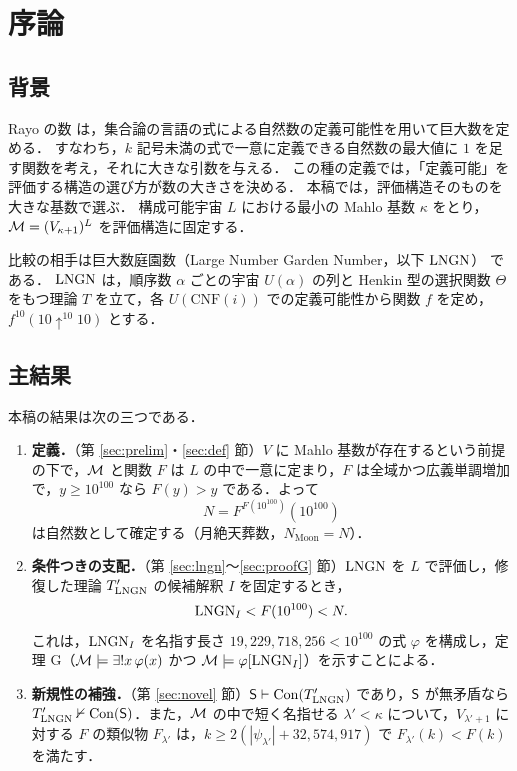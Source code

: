 \section{序論}

\subsection{背景}
Rayo の数 \cite{rayo} は，集合論の言語の式による自然数の定義可能性を用いて巨大数を定める．
すなわち，$k$ 記号未満の式で一意に定義できる自然数の最大値に $1$ を足す関数を考え，それに大きな引数を与える．
この種の定義では，「定義可能」を評価する構造の選び方が数の大きさを決める．
本稿では，評価構造そのものを大きな基数で選ぶ．
構成可能宇宙 $L$ における最小の Mahlo 基数 $\kappa$ をとり，$\mathcal{M}=(V_{\kappa+1})^L$ を評価構造に固定する．

比較の相手は巨大数庭園数（Large Number Garden Number，以下 $\mathrm{LNGN}$）\cite{lngn} である．
$\mathrm{LNGN}$ は，順序数 $\alpha$ ごとの宇宙 $U(\alpha)$ の列と Henkin 型の選択関数 $\Theta$ をもつ理論 $T$ を立て，各 $U(\mathrm{CNF}(i))$ での定義可能性から関数 $f$ を定め，$f^{10}(10\uparrow^{10}10)$ とする．

\subsection{主結果}
本稿の結果は次の三つである．

\begin{enumerate}[label=(\arabic*)]
\item \textbf{定義．}（第 \ref{sec:prelim}・\ref{sec:def} 節）$V$ に Mahlo 基数が存在するという前提の下で，$\mathcal{M}$ と関数 $F$ は $L$ の中で一意に定まり，$F$ は全域かつ広義単調増加で，$y\ge 10^{100}$ なら $F(y)>y$ である．よって
\[ N = F^{F(10^{100})}(10^{100}) \]
は自然数として確定する（月絶天葬数，$N_{\mathrm{Moon}}=N$）．
\item \textbf{条件つきの支配．}（第 \ref{sec:lngn}〜\ref{sec:proofG} 節）$\mathrm{LNGN}$ を $L$ で評価し，修復した理論 $T'_{\mathrm{LNGN}}$ の候補解釈 $I$ を固定するとき，
\[ \mathrm{LNGN}_I < F(10^{100}) < N. \]
これは，$\mathrm{LNGN}_I$ を名指す長さ $19{,}229{,}718{,}256<10^{100}$ の式 $\varphi$ を構成し，定理 G（$\mathcal{M}\models\exists!x\,\varphi(x)$ かつ $\mathcal{M}\models\varphi[\mathrm{LNGN}_I]$）を示すことによる．
\item \textbf{新規性の補強．}（第 \ref{sec:novel} 節）$\mathsf{S}\vdash\mathrm{Con}(T'_{\mathrm{LNGN}})$ であり，$\mathsf{S}$ が無矛盾なら $T'_{\mathrm{LNGN}}\nvdash\mathrm{Con}(\mathsf{S})$．また，$\mathcal{M}$ の中で短く名指せる $\lambda'<\kappa$ について，$V_{\lambda'+1}$ に対する $F$ の類似物 $F_{\lambda'}$ は，$k\ge 2(|\psi_{\lambda'}|+32{,}574{,}917)$ で $F_{\lambda'}(k)<F(k)$ を満たす．
\end{enumerate}

